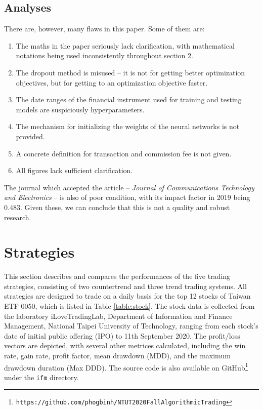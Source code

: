 \documentclass[12pt, letterpaper, oneside]{article}
\begin{document}
\subsection{Analyses}
There are, however, many flaws in this paper. Some of them are:
\begin{enumerate}
    \item The maths in the paper seriously lack clarification, with mathematical notations being used inconsistently throughout section 2.
    \item The dropout method is misused -- it is not for getting better optimization objectives, but for getting to an optimization objective faster.
    \item The date ranges of the financial instrument used for training and testing models are suspiciously hyperparameters.
    \item The mechanism for initializing the weights of the neural networks is not provided.
    \item A concrete definition for transaction and commission fee is not given.
    \item All figures lack sufficient clarification.
\end{enumerate}
The journal which accepted the article -- \textit{Journal of Communications Technology and Electronics} -- is also of poor condition, with its impact factor in 2019 being 0.483\cite{comtech}. Given these, we can conclude that this is not a quality and robust research.

\section{Strategies}
This section describes and compares the performances of the five trading strategies, consisting of two countertrend and three trend trading systems. All strategies are designed to trade on a daily basis for the top 12 stocks of Taiwan ETF 0050, which is listed in Table \ref{table:stock}. The stock data is collected from the laboratory iLoveTradingLab, Department of Information and Finance Management, National Taipei University of Technology, ranging from each stock's date of initial public offering (IPO) to 11th September 2020. The profit/loss vectors are depicted, with several other metrices calculated, including the win rate, gain rate, profit factor, mean drawdown (MDD), and the maximum drawdown duration (Max DDD). The source code is also available on GitHub\footnote{\texttt{https://github.com/phogbinh/NTUT2020FallAlgorithmicTrading}} under the \texttt{ifm} directory.
\end{document}
